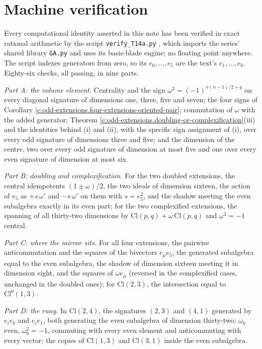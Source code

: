 \documentclass[11pt]{article}
\theoremstyle{definition}
\theoremstyle{plain}
\providecommand{\Cl}{}\renewcommand{\Cl}{\mathrm{Cl}}
\begin{document}
\section{Machine verification}

\label{c:note.odd-extensions.setting-machine-verification}
Every computational identity asserted in this note has been verified in exact rational arithmetic by the script \texttt{verify\_T14a.py} \cite{ButlerVerifyT14ext}, which imports the series' shared library \texttt{GA.py} and uses its basis-blade engine; no floating point anywhere. The script indexes generators from zero, so its $e_{0}, \ldots, e_{5}$ are the text's $e_{1}, \ldots, e_{6}$. Eighty-six checks, all passing, in nine parts.

\emph{Part A: the volume element.} Centrality and the sign $\omega^{2} = (-1)^{n(n-1)/2+q}$ on every diagonal signature of dimensions one, three, five and seven; the four signs of Corollary \ref{c:odd-extensions.four-extensions-oriented-pair}; commutation of $\omega$ with the added generator; Theorem \ref{c:odd-extensions.doubling-or-complexification}(iii) and the identities behind (i) and (ii), with the specific sign assignment of (i), over every odd signature of dimensions three and five; and the dimension of the centre, two over every odd signature of dimension at most five and one over every even signature of dimension at most six.

\emph{Part B: doubling and complexification.} For the two doubled extensions, the central idempotents $(1 \pm \omega)/2$, the two ideals of dimension sixteen, the action of $e_{5}$ as $+s\,\omega'$ and $-s\,\omega'$ on them with $s = e_{5}^{2}$, and the shadow meeting the even subalgebra exactly in its even part; for the two complexified extensions, the spanning of all thirty-two dimensions by $\Cl(p,q) + \omega\,\Cl(p,q)$ and $\omega^{2} = -1$ central.

\emph{Part C: where the mirror sits.} For all four extensions, the pairwise anticommutation and the squares of the bivectors $e_{\mu}e_{5}$, the generated subalgebra equal to the even subalgebra, the shadow of dimension sixteen meeting it in dimension eight, and the squares of $\omega e_{\mu}$ (reversed in the complexified cases, unchanged in the doubled ones); for $\Cl(2,3)$, the intersection equal to $\Cl^{0}(1,3)$.

\emph{Part D: the rung.} In $\Cl(2,4)$, the signatures $(2,3)$ and $(4,1)$ generated by $e_{i}e_{6}$ and $e_{i}e_{1}$, both generating the even subalgebra of dimension thirty-two; $\omega_{6}$ even, $\omega_{6}^{2} = -1$, commuting with every even element and anticommuting with every vector; the copies of $\Cl(1,3)$ and $\Cl(3,1)$ inside the even subalgebra.
\end{document}
